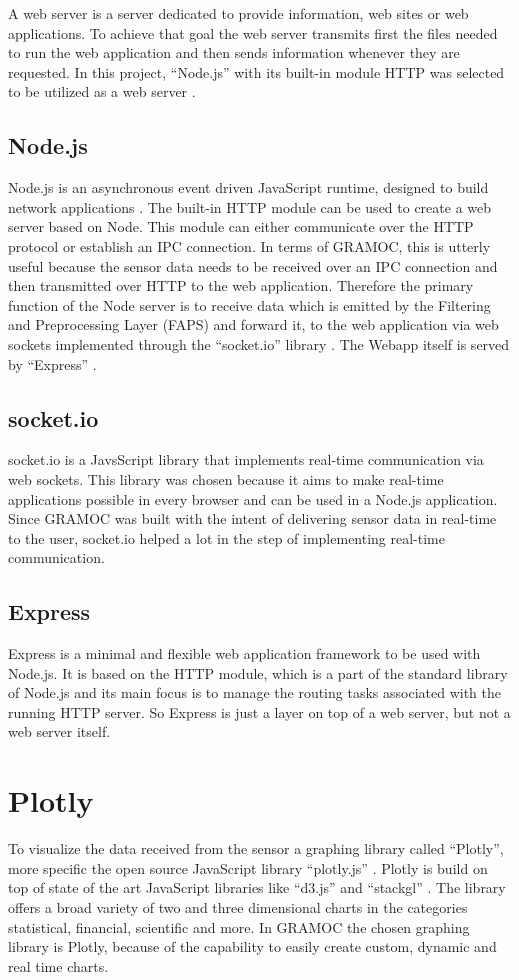 A web server is a server dedicated to provide information, web sites or web applications. To achieve that goal the web server transmits first the files needed to run the web application and then sends information whenever they are requested. In this project, ``Node.js'' with its built-in module HTTP was selected to be utilized as a web server \cite{Node}.

\subsection{Node.js}
Node.js is an asynchronous event driven JavaScript runtime, designed to build network applications \cite{Node}. The built-in HTTP module can be used to create a web server based on Node. This module can either communicate over the HTTP protocol or establish an IPC connection. In terms of GRAMOC, this is utterly useful because the sensor data needs to be received over an IPC connection and then transmitted over HTTP to the web application. Therefore the primary function of the Node server is to receive data which is emitted by the Filtering and Preprocessing Layer (FAPS) and forward it, to the web application via web sockets implemented through the ``socket.io'' library \cite{socketio}. The Webapp itself is served by ``Express'' \cite{express}.

\subsection{socket.io}
socket.io is a JavsScript library that implements real-time communication via web sockets. This library was chosen because it aims to make real-time applications possible in every browser and can be used in a Node.js application. Since GRAMOC was built with the intent of delivering sensor data in real-time to the user, socket.io helped a lot in the step of implementing real-time communication.

\subsection{Express}
Express is a minimal and flexible web application framework to be used with Node.js. It is based on the HTTP module, which is a part of the standard library of Node.js and its main focus is to manage the routing tasks associated with the running HTTP server. So Express is just a layer on top of a web server, but not a web server itself.

\section{Plotly}
To visualize the data received from the sensor a graphing library called ``Plotly'', more specific the open source JavaScript library ``plotly.js'' \cite{Plotly} \cite{PlotlyJS}. Plotly is build on top of state of the art JavaScript libraries like ``d3.js''  and ``stackgl'' \cite{d3} \cite{stackgl}. The library offers a broad variety of two and three dimensional charts in the categories statistical, financial, scientific and more. In GRAMOC the chosen graphing library is Plotly, because of the capability to easily create custom, dynamic and real time charts.


